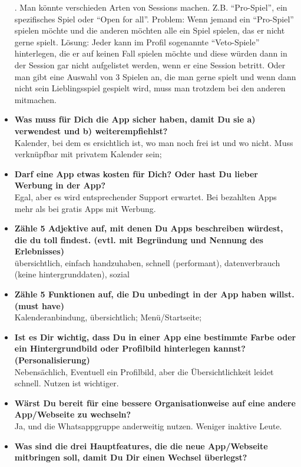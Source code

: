 \begin{appendix}
\begin{itemize}
    . Man könnte verschieden Arten von Sessions machen. Z.B. “Pro-Spiel”, ein spezifisches Spiel oder “Open for all”. Problem: Wenn jemand ein “Pro-Spiel” spielen möchte und die anderen möchten alle ein Spiel spielen, das er nicht gerne spielt. Lösung: Jeder kann im Profil sogenannte “Veto-Spiele” hinterlegen, die er auf keinen Fall spielen möchte und diese würden dann in der Session gar nicht aufgelistet werden, wenn er eine Session betritt. Oder man gibt eine Auswahl von 3 Spielen an, die man gerne spielt und wenn dann nicht sein Lieblingsspiel gespielt wird, muss man trotzdem bei den anderen mitmachen.
    \item \textbf{Was muss für Dich die App sicher haben, damit Du sie a) verwendest und b) weiterempfiehlst?}\\
    Kalender, bei dem es ersichtlich ist, wo man noch frei ist und wo nicht. Muss verknüpfbar mit privatem Kalender sein;
    \item \textbf{Darf eine App etwas kosten für Dich? Oder hast Du lieber Werbung in der App?}\\
    Egal, aber es wird entsprechender Support erwartet. Bei bezahlten Apps mehr als bei gratis Apps mit Werbung.
    \item \textbf{Zähle 5 Adjektive auf, mit denen Du Apps beschreiben würdest, die du toll findest. (evtl. mit Begründung und Nennung des Erlebnisses)}\\
    übersichtlich, einfach handzuhaben, schnell (performant), datenverbrauch (keine hintergrunddaten), sozial
    \item \textbf{Zähle 5 Funktionen auf, die Du unbedingt in der App haben willst. (must have)}\\
    Kalenderanbindung, übersichtlich; Menü/Startseite;
    \item \textbf{Ist es Dir wichtig, dass Du in einer App eine bestimmte Farbe oder ein Hintergrundbild oder Profilbild hinterlegen kannst? (Personalisierung)}\\
    Nebensächlich, Eventuell ein Profilbild, aber die Übersichtlichkeit leidet schnell. Nutzen ist wichtiger.
    \item \textbf{Wärst Du bereit für eine bessere Organisationweise auf eine andere App/Webseite zu wechseln?}\\
    Ja, und die Whatsappgruppe anderweitig nutzen. Weniger inaktive Leute.
    \item \textbf{Was sind die drei Hauptfeatures, die die neue App/Webseite mitbringen soll, damit Du Dir einen Wechsel überlegst?}\\

\end{itemize}
\end{appendix}
